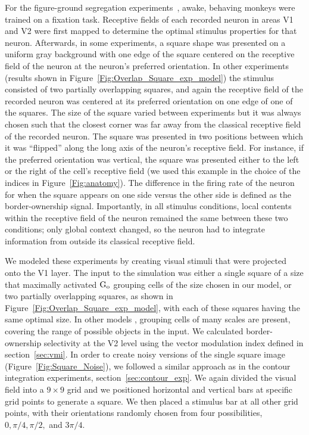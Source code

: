 For the figure-ground segregation experiments~\citep{Zhou_etal00,  Qiu_etal07, Zhang_vonderHeydt10}, awake, behaving monkeys were trained on a fixation task.  Receptive fields of each recorded neuron in areas V1 and V2 were first mapped to determine the optimal stimulus properties for that neuron. Afterwards, in some experiments, a square
shape was presented on a uniform gray background with one edge of the
square centered on the receptive field of the neuron at the neuron's
preferred orientation.  In other experiments (results shown in
Figure~\ref{Fig:Overlap_Square_exp_model}) %
the stimulus consisted of two partially
overlapping squares, and again the receptive field of the recorded
neuron was centered at its preferred orientation on one edge of one of
the squares.  The size of the square varied between experiments but it
was always chosen such that the closest corner was far away from the
classical receptive field of the recorded neuron. The square was
presented in two positions between which it was ``flipped'' along the
long axis of the neuron's receptive field. For instance, if the preferred orientation was vertical, the square was presented either to
the left or the right of the cell's receptive field (we used this
example in the choice of the indices in Figure~\ref{Fig:anatomy}).
The difference in the firing rate of the neuron for when the square
appears on one side versus the other side is defined
as the border-ownership signal. Importantly, in all stimulus conditions, local 
contents 
%
within the receptive field of the neuron remained the same between these two conditions; only global context changed, so the neuron had to integrate information from outside its classical receptive field.

We modeled these experiments by creating visual stimuli that were projected onto the V1 layer. The input to the simulation was either a
single square of a size that maximally activated $\rm G_o$ grouping
cells of the size chosen in our model, or two partially overlapping
squares, as shown in Figure~\ref{Fig:Overlap_Square_exp_model}, with each of these squares having the same optimal size. In other models
\citep{Craft_etal07,Mihalas_etal11b,Russell_etal14}, grouping cells of
many scales are present, covering the range of possible objects in the
input. We calculated border-ownership selectivity at the V2 level
using the vector modulation index defined in section~\ref{sec:vmi}.
In order to create noisy versions of the single square image (Figure~\ref{Fig:Square_Noise}), we followed a similar approach as in
the contour integration experiments, section~\ref{sec:contour_exp}.
We again divided the visual field into a $9 \times 9$ grid and we positioned horizontal and vertical bars at specific grid points to
generate a square. We then placed a stimulus bar at all other grid
points, with their orientations randomly chosen from four possibilities, $0, \pi/4, \pi/2,$ and $3\pi/4$.

